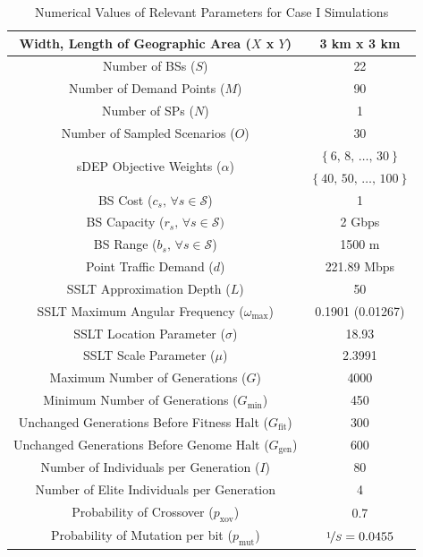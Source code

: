 \documentclass[12pt,dvipsnames]{report}
\begin{document}
\begin{table}[p]
	\centering
	\caption{Numerical Values of Relevant Parameters for Case I Simulations}
	\begin{tabular}{|c|c|} 
	\hline
		Width, Length of Geographic Area ($X$ x $Y$) & 3 km x 3 km \\
		\hline
		Number of BSs ($S$) & 22 \\ 
		\hline 
		Number of Demand Points ($M$) & 90 \\ 
		\hline 
		Number of SPs ($N$) & 1 \\
		\hline
		Number of Sampled Scenarios ($O$) & 30 \\ 
		\hline 
		\multirow{2}{*}{sDEP Objective Weights ($\alpha$)} & $\left\{ 6,\, 8,\, \ldots,\, 30 \right\}$ \\
		& $\left\{ 40,\, 50,\, \ldots,\, 100 \right\}$ \\
		\hline
		BS Cost ($c_s,\, \forall s \in \mathcal{S}$) & 1 \\ 
		\hline 
		BS Capacity ($r_s,\, \forall s \in \mathcal{S})$ & 2 Gbps \\ 
		\hline
		BS Range ($b_s,\, \forall s \in \mathcal{S}$) & 1500 m \\
		\hline 
		Point Traffic Demand ($d$) & 221.89 Mbps \\ 
		\hline 
		\hline
		SSLT Approximation Depth ($L$) & 50 \\ 
		\hline
		SSLT Maximum Angular Frequency ($\omega_{\max}$) & 0.1901 (0.01267) \\
		\hline 
		SSLT Location Parameter ($\sigma$) & 18.93 \\ 
		\hline 
		SSLT Scale Parameter ($\mu$) & 2.3991 \\ 
		\hline 
		\hline
		Maximum Number of Generations ($G$) & 4000 \\ 
		\hline
		Minimum Number of Generations ($G_{\min}$) & 450 \\
		\hline
		Unchanged Generations Before Fitness Halt ($G_{\text{fit}}$) & 300 \\
		\hline 
		Unchanged Generations Before Genome Halt ($G_{\text{gen}}$) & 600 \\
		\hline 
		Number of Individuals per Generation ($I$) & 80 \\ 
		\hline
		Number of Elite Individuals per Generation & 4 \\
		\hline 
		Probability of Crossover ($p_\text{xov}$) & 0.7 \\ 
		\hline
		Probability of Mutation per bit ($p_\text{mut}$) & $\nicefrac{1}{S} = 0.0455$ \\

\end{tabular}
\end{table}
\end{document}

